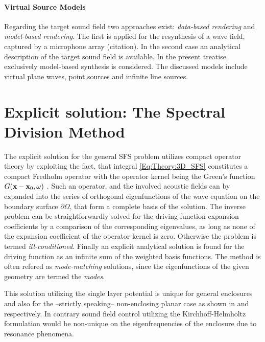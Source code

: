 \paragraph{Virtual Source Models}
Regarding the target sound field two approaches exist: \emph{data-based rendering} and \emph{model-based rendering}. The first is applied for the resynthesis of a wave field, captured by a microphone array (citation). In the second case an analytical description of the target sound field is available. In the present treatise exclusively model-based synthesis is considered. The discussed models include virtual plane waves, point sources and infinite line sources.


\newpage
\section{Explicit solution: The Spectral Division Method}

The explicit solution for the general SFS problem utilizes compact operator theory by exploiting the fact, that integral \ref{Eq:Theory:3D_SFS} constitutes a compact Fredholm operator with the operator kernel being the Green's function $G(\mathbf{x} - \mathbf{x}_0 , \omega )$ \cite{Ahrens2012,MorseFeshbach1953}.
Such an operator, and the involved acoustic fields can by expanded into the series of orthogonal eigenfunctions of the wave equation on the boundary surface $\partial \Omega$, that form a complete basis of the solution. The inverse problem can be straightforwardly solved for the driving function expansion coefficients by a comparison of the corresponding eigenvalues, as long as none of the expansion coefficient of the operator kernel is zero. Otherwise the problem is termed \emph{ill-conditioned}. 
Finally an explicit analytical solution is found for the driving function as an infinite sum of the weighted basis functions.
The method is often refered as \emph{mode-matching} solutions, since the eigenfunctions of the given geometry are termed the \emph{modes}.

This solution utilizing the single layer potential is unique for general enclosures and also for the --strictly speaking-- non-enclosing planar case as shown in \cite{Zotter2013:uniqueness} and \cite{Fazi2010} respectively. In contrary sound field control utilizing the Kirchhoff-Helmholtz formulation would be non-unique on the eigenfrequencies of the enclosure due to resonance phenomena.

